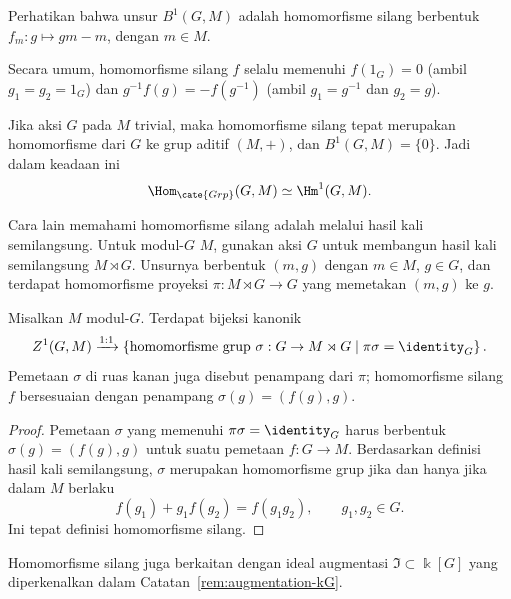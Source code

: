 Perhatikan bahwa unsur $B^1(G,M)$ adalah homomorfisme silang berbentuk
$f_m:g\mapsto gm-m$, dengan $m\in M$.

Secara umum, homomorfisme silang $f$ selalu memenuhi $f(1_G)=0$ (ambil
$g_1=g_2=1_G$) dan $g^{-1}f(g)=-f(g^{-1})$ (ambil $g_1=g^{-1}$ dan $g_2=g$).

\begin{example}
	Jika aksi $G$ pada $M$ trivial, maka homomorfisme silang tepat merupakan
	homomorfisme dari $G$ ke grup aditif $(M,+)$, dan $B^1(G,M)=\{0\}$. Jadi
	dalam keadaan ini
	\[ \Hom_{\cate{Grp}}(G,M)\simeq\Hm^1(G,M). \]
\end{example}

Cara lain memahami homomorfisme silang adalah melalui hasil kali semilangsung.
Untuk modul-$G$ $M$, gunakan aksi $G$ untuk membangun hasil kali semilangsung
$M\rtimes G$. Unsurnya berbentuk $(m,g)$ dengan $m\in M$, $g\in G$, dan
terdapat homomorfisme proyeksi $\pi:M\rtimes G\to G$ yang memetakan $(m,g)$
ke $g$.

\begin{proposition}\label{prop:crossed-semidirect-product}
	Misalkan $M$ modul-$G$. Terdapat bijeksi kanonik
	\[ Z^1(G,M)\xrightarrow{1:1}
	\left\{\text{homomorfisme grup }\sigma:G\to M\rtimes G
	\;\middle|\;\pi\sigma=\identity_G\right\}. \]
	Pemetaan $\sigma$ di ruas kanan juga disebut penampang dari $\pi$;
	homomorfisme silang $f$ bersesuaian dengan penampang
	$\sigma(g)=(f(g),g)$.
\end{proposition}
\begin{proof}
	Pemetaan $\sigma$ yang memenuhi $\pi\sigma=\identity_G$ harus berbentuk
	$\sigma(g)=(f(g),g)$ untuk suatu pemetaan $f:G\to M$. Berdasarkan definisi
	hasil kali semilangsung, $\sigma$ merupakan homomorfisme grup jika dan hanya
	jika dalam $M$ berlaku
	\[ f(g_1)+g_1f(g_2)=f(g_1g_2),\qquad g_1,g_2\in G. \]
	Ini tepat definisi homomorfisme silang.
\end{proof}

Homomorfisme silang juga berkaitan dengan ideal augmentasi
$\mathfrak{I}\subset\Bbbk[G]$ yang diperkenalkan dalam
Catatan~\ref{rem:augmentation-kG}.

